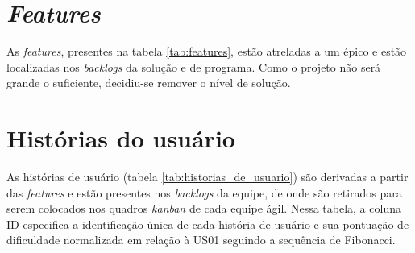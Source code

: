 \documentclass[
	12pt,				%
	oneside,			%
	a4paper,			%
	english,			%
	brazil,				%
	]{abntex2}
\begin{document}
\begin{table}[ht]
\end{table}

\section{\textit{Features}}
As \foreignlanguage{english}{\textit{features}}, presentes na tabela \ref{tab:features}, estão atreladas a um épico e estão localizadas nos \foreignlanguage{english}{\textit{backlogs}} da solução e de programa. Como o projeto não será grande o suficiente, decidiu-se remover o nível de solução.

\begin{table}[htb]
\end{table}

\section{Histórias do usuário}
As histórias de usuário (tabela \ref{tab:historias_de_usuario}) são derivadas a partir das \foreignlanguage{english}{\textit{features}} e estão presentes nos \foreignlanguage{english}{\textit{backlogs}} da equipe, de onde são retirados para serem colocados nos quadros \textit{kanban} de cada equipe ágil. Nessa tabela, a coluna ID especifica a identificação única de cada história de usuário e sua pontuação de dificuldade normalizada em relação à US01 seguindo a sequência de Fibonacci.
\end{document}
